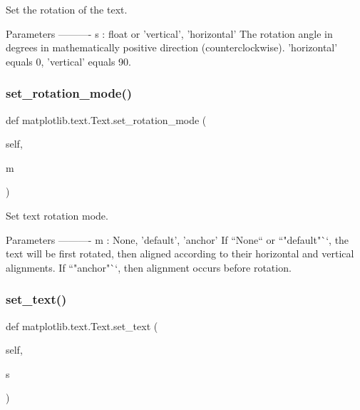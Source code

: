 \begin{DoxyVerb}Set the rotation of the text.

Parameters
----------
s : float or {'vertical', 'horizontal'}
    The rotation angle in degrees in mathematically positive direction
    (counterclockwise). 'horizontal' equals 0, 'vertical' equals 90.
\end{DoxyVerb}
 \mbox{\label{classmatplotlib_1_1text_1_1Text_a60c6f4ced70cab87ba7c8fc2b9f11b6f}} 
\subsubsection{\texorpdfstring{set\+\_\+rotation\+\_\+mode()}{set\_rotation\_mode()}}
{\footnotesize\ttfamily def matplotlib.\+text.\+Text.\+set\+\_\+rotation\+\_\+mode (\begin{DoxyParamCaption}\item[{}]{self,  }\item[{}]{m }\end{DoxyParamCaption})}

\begin{DoxyVerb}Set text rotation mode.

Parameters
----------
m : {None, 'default', 'anchor'}
    If ``None`` or ``"default"``, the text will be first rotated, then
    aligned according to their horizontal and vertical alignments.  If
    ``"anchor"``, then alignment occurs before rotation.
\end{DoxyVerb}
 \mbox{\label{classmatplotlib_1_1text_1_1Text_ad561798c62fcca578ab1ed7375338bea}} 
\subsubsection{\texorpdfstring{set\+\_\+text()}{set\_text()}}
{\footnotesize\ttfamily def matplotlib.\+text.\+Text.\+set\+\_\+text (\begin{DoxyParamCaption}\item[{}]{self,  }\item[{}]{s }\end{DoxyParamCaption})}


